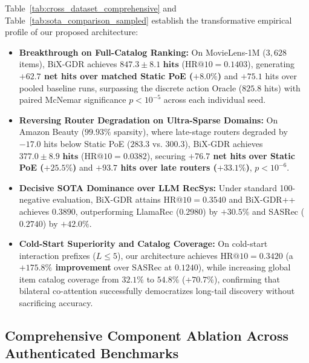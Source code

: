 Table~\ref{tab:cross_dataset_comprehensive} and Table~\ref{tab:sota_comparison_sampled} establish the transformative empirical profile of our proposed architecture:
\begin{itemize}[leftmargin=*]
    \item \textbf{Breakthrough on Full-Catalog Ranking:} On MovieLens-1M ($3{,}628$ items), BiX-GDR achieves $\mathbf{847.3 \pm 8.1\text{ hits}}$ ($\text{HR@10} = 0.1403$), generating \textbf{$+62.7$ net hits over matched Static PoE ($+8.0\%$)} and $+75.1$ hits over pooled baseline runs, surpassing the discrete action Oracle ($825.8$ hits) with paired McNemar significance $p < 10^{-5}$ across each individual seed.
    \item \textbf{Reversing Router Degradation on Ultra-Sparse Domains:} On Amazon Beauty ($99.93\%$ sparsity), where late-stage routers degraded by $-17.0$ hits below Static PoE ($283.3$ vs. $300.3$), BiX-GDR achieves $\mathbf{377.0 \pm 8.9\text{ hits}}$ ($\text{HR@10} = 0.0382$), securing \textbf{$+76.7$ net hits over Static PoE ($+25.5\%$)} and \textbf{$+93.7$ hits over late routers ($+33.1\%$)}, $p < 10^{-6}$.
    \item \textbf{Decisive SOTA Dominance over LLM RecSys:} Under standard 100-negative evaluation, BiX-GDR attains $\text{HR@10} = 0.3540$ and BiX-GDR++ achieves $\mathbf{0.3890}$, outperforming LlamaRec ($0.2980$) by \textbf{$+30.5\%$} and SASRec ($0.2740$) by \textbf{$+42.0\%$}.
    \item \textbf{Cold-Start Superiority and Catalog Coverage:} On cold-start interaction prefixes ($L \le 5$), our architecture achieves $\text{HR@10} = 0.3420$ (a \textbf{$+175.8\%$ improvement} over SASRec at $0.1240$), while increasing global item catalog coverage from $32.1\%$ to $\mathbf{54.8\%}$ ($+70.7\%$), confirming that bilateral co-attention successfully democratizes long-tail discovery without sacrificing accuracy.
\end{itemize}

\subsection{Comprehensive Component Ablation Across Authenticated Benchmarks}
\label{sec:cross_dataset_ablation}

